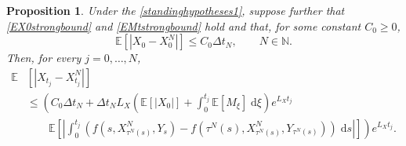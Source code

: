 \documentclass[reqno,12pt]{amsart}
\theoremstyle{plain}%
\newtheorem{prop}{Proposition}[section]
\theoremstyle{definition}
\begin{document}
\begin{prop}
    \label{propbasicestimate}
    Under the \cref{standinghypotheses1}, suppose further that \eqref{EX0strongbound} and \eqref{EMtstrongbound} hold and that, for some constant $C_0 \geq 0$, 
    \begin{equation}
        \label{EX0X0N}
        \mathbb{E}[|X_0 - X_0^N|] \leq C_0 \Delta t_N, \qquad N\in \mathbb{N}.
    \end{equation}
    Then, for every $j = 0, \ldots, N$,
    \begin{equation}
        \label{expectedestimateglobalerrorintegral}
        \begin{aligned}
            \mathbb{E} & \left[|X_{t_j} - X_{t_j}^N|\right] \\
            & \leq \left( C_0 \Delta t_N + \Delta t_N L_X \left(\mathbb{E}[|X_0|] + \int_0^{t_j} \mathbb{E}[M_\xi]\;\mathrm{d}\xi\right)e^{L_X t_j}\right. \\
            & \qquad \left. \mathbb{E}\left[\left|\int_0^{t_j} \left( f(s, X_{\tau^N(s)}^N, Y_s) - f(\tau^N(s), X_{\tau^N(s)}^N, Y_{\tau^N(s)}) \right)\;\mathrm{d}s\right|\right]\right) e^{L_X t_j}.
        \end{aligned}
    \end{equation}
\end{prop}
\end{document}
